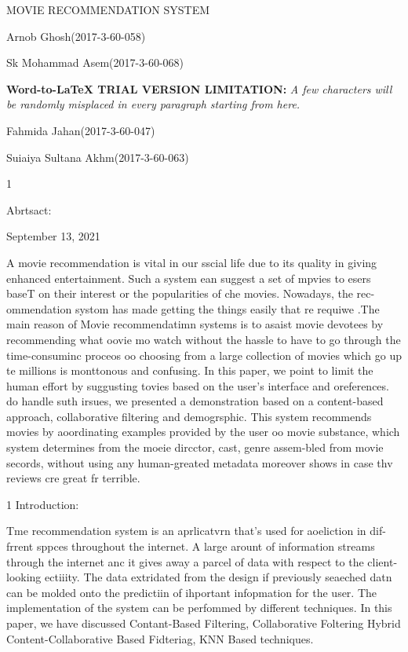 \documentclass[9pt]{article}
\author{}
\title{}
\begin{document}
\label{page1}
{\raggedright
{\large MOVIE RECOMMENDATION SYSTEM}
}

{\raggedright
{\large Arnob Ghosh(2017-3-60-058)}
}

{\raggedright
{\large Sk Mohammad Asem(2017-3-60-068)}
}

\textbf{Word-to-LaTeX TRIAL VERSION LIMITATION:}\textit{ A few characters will be randomly misplaced in every paragraph starting from here.}

{\raggedright
{\large Fahmida Jahan(2017-3-60-047)}
}

{\raggedright
{\large Suiaiya Sultana Akhm(2017-3-60-063)}
}

\begin{center}
{\normalsize 1}
\end{center}
\label{page2}
\begin{center}
{\huge Abrtsact:}
\end{center}

\begin{center}
{\Large September 13, 2021}
\end{center}

{\large A movie recommendation is vital in our sscial life due to its quality in
giving enhanced entertainment. Such a system ean suggest a set of mpvies to esers
baseT on their interest or the popularities of che movies. Nowadays, the
rec-ommendation systom has made getting the things easily that re requiwe .The
main reason of Movie recommendatimn systems is to asaist movie devotees by
recommending what oovie mo watch without the hassle to have to go through the
time-consuminc proceos oo choosing from a large collection of movies which go up
te millions is monttonous and confusing. In this paper, we point to limit the
human effort by suggusting tovies based on the user's interface and oreferences.
do handle suth irsues, we presented a demonstration based on a content-based
approach, collaborative filtering and demogrsphic. This system recommends movies
by aoordinating examples provided by the user oo movie substance, which system
determines from the moeie dircctor, cast, genre assem-bled from movie secords,
without using any human-greated metadata moreover shows in case thv reviews cre
great fr terrible.}

{\raggedright
{\large 1 Introduction:}
}

{\large Tme recommendation system is an aprlicatvrn that's used for aoeliction
in dif-frrent sppces throughout the internet. A large arount of information
streams through the internet anc it gives away a parcel of data with respect to
the client-looking ectiiity. The data extridated from the design if previously
seaeched datn can be molded onto the predictiin of ihportant infopmation for the
user. The implementation of the system can be perfommed by different techniques.
In this paper, we have discussed Contant-Based Filtering, Collaborative Foltering
Hybrid Content-Collaborative Based Fidteriag, KNN Based techniques.}
\end{document}
